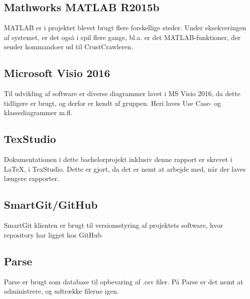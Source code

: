 \subsection*{Mathworks MATLAB R2015b}
MATLAB er i projektet blevet brugt flere forskellige steder. Under eksekveringen af systemet, er det også i spil flere gange, bl.a. er det MATLAB-funktioner, der sender kommandoer ud til CrustCrawleren.

\subsection*{Microsoft Visio 2016}

Til udvikling af software er diverse diagrammer lavet i MS Visio 2016, da dette tidligere er brugt, og derfor er kendt af gruppen. Heri laves Use Case- og klassediagrammer m.fl.

\subsection*{TexStudio}
Dokumentationen i dette bachelorprojekt inklusiv denne rapport er skrevet i \LaTeX, i TexStudio. Dette er gjort, da det er nemt at arbejde med, når der laves længere rapporter.

\subsection*{SmartGit/GitHub}
SmartGit klienten\citep{smartgit} er brugt til versionsstyring af projektets software, hvor repository har ligget hos GitHub\citep{github}

\subsection*{Parse}
Parse \citep{RefWorks:11} er brugt som database til opbevaring af .csv filer. På Parse er det nemt at administrere, og udtrække filerne igen.